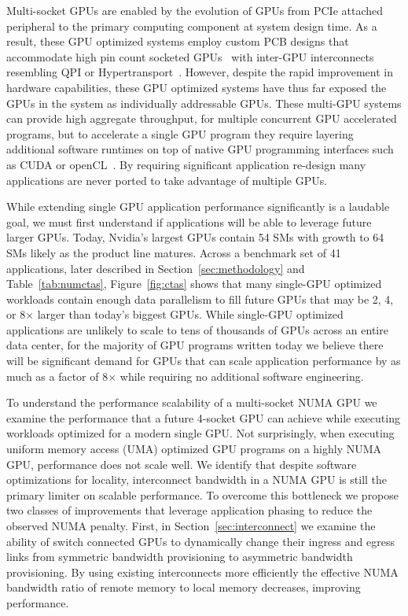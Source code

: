 Multi-socket GPUs are enabled by the evolution of GPUs from PCIe attached 
peripheral to the primary computing component at system design time.  As a 
result, these GPU optimized systems employ custom PCB designs that accommodate 
high pin count socketed GPUs~\cite{dgx} with inter-GPU interconnects resembling 
QPI or Hypertransport~\cite{NVLINK,INTELQPI,AMDHT}.  However, despite the rapid 
improvement in hardware capabilities, these GPU optimized systems have 
thus far exposed the GPUs in the system as individually addressable GPUs. These
multi-GPU systems can provide high aggregate throughput, for multiple concurrent
GPU accelerated programs, but to accelerate a single GPU program they
require layering additional software runtimes on top of native GPU programming 
interfaces such as CUDA or openCL~\cite{CUDA,OPENCL}. By requiring significant
application re-design many applications are never ported to take advantage
of multiple GPUs.

While extending single GPU application performance significantly is a laudable
goal, we must first understand if applications will be able to leverage future
larger GPUs.  Today, Nvidia's largest GPUs contain 54 SMs with growth to 64 SMs
likely as the product line matures. Across a benchmark set of 41 applications,
later described in Section~\ref{sec:methodology} and Table~\ref{tab:numctas},
Figure~\ref{fig:ctas} shows that many single-GPU optimized workloads contain enough data 
parallelism 
to fill future GPUs that may be 2, 4, or 8$\times$ larger than today's biggest
GPUs.  While single-GPU optimized applications are unlikely to scale to tens
of thousands of GPUs across an entire data center, for the majority of GPU
programs written today we believe there will be significant demand for GPUs that
can scale application performance by as much as a factor of 8$\times$ 
while requiring no additional software engineering.

To understand the performance scalability of a multi-socket NUMA GPU we examine 
the performance that a future 4-socket GPU can achieve while executing 
workloads optimized for a modern single GPU. Not surprisingly, when executing 
uniform memory access (UMA) optimized GPU programs on a highly NUMA GPU, 
performance does not scale well.  We identify that despite software 
optimizations for locality, interconnect bandwidth in a NUMA GPU is still the 
primary limiter on scalable performance.  To overcome this bottleneck we propose 
two classes of improvements that leverage application phasing to reduce the 
observed NUMA penalty.  First, in Section~\ref{sec:interconnect} we examine the 
ability of switch connected GPUs to dynamically change their ingress and egress 
links from symmetric bandwidth provisioning to asymmetric bandwidth 
provisioning.  By using existing interconnects more efficiently the effective 
NUMA bandwidth ratio of remote memory to local memory decreases, improving 
performance.

